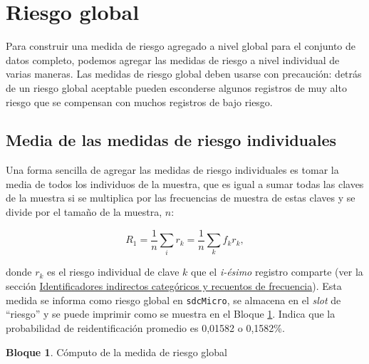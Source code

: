 \documentclass[
]{book}
\newenvironment{Shaded}{\begin{snugshade}}{\end{snugshade}}
\newcommand{\CommentTok}[1]{\textcolor[rgb]{0.56,0.35,0.01}{\textit{#1}}}
\newcommand{\NormalTok}[1]{#1}
\newcommand{\SpecialCharTok}[1]{\textcolor[rgb]{0.00,0.00,0.00}{#1}}
\theoremstyle{definition}
\theoremstyle{definition}
\newtheorem{example}{Bloque}[chapter]
\theoremstyle{definition}
\theoremstyle{definition}
\theoremstyle{remark}
\begin{document}
\hypertarget{riesgo-global}{%
\section{Riesgo global}\label{riesgo-global}}

Para construir una medida de riesgo agregado a nivel global para el conjunto de datos completo, podemos agregar las medidas de riesgo a nivel individual de varias maneras. Las medidas de riesgo global deben usarse con precaución: detrás de un riesgo global aceptable pueden esconderse algunos registros de muy alto riesgo que se compensan con muchos registros de bajo riesgo.

\hypertarget{media-de-las-medidas-de-riesgo-individuales}{%
\subsection{Media de las medidas de riesgo individuales}\label{media-de-las-medidas-de-riesgo-individuales}}

Una forma sencilla de agregar las medidas de riesgo individuales es tomar la media de todos los individuos de la muestra, que es igual a sumar todas las claves de la muestra si se multiplica por las frecuencias de muestra de estas claves y se divide por el tamaño de la muestra, \(n\):

\[R_{1}=\frac{1}{n}\sum_{i} r_{k}=\frac{1}{n}\sum_{k}f_{k}r_{k},\]

donde \(r_{k}\) es el riesgo individual de clave \(k\) que el \emph{i-ésimo} registro comparte (ver la sección \protect\hyperlink{identificadores-indirectos-categuxf3ricos-y-recuentos-de-frecuencia}{Identificadores indirectos categóricos y recuentos de frecuencia}). Esta medida se informa como riesgo global en \texttt{sdcMicro}, se almacena en el \emph{slot} de ``riesgo'' y se puede imprimir como se muestra en el Bloque \ref{exm:bloqueMR9}. Indica que la probabilidad de reidentificación promedio es 0,01582 o 0,1582\%.

\begin{example}
\protect\hypertarget{exm:bloqueMR9}{}\label{exm:bloqueMR9}Cómputo de la medida de riesgo global
\end{example}

\begin{Shaded}
\end{Shaded}
\end{document}
